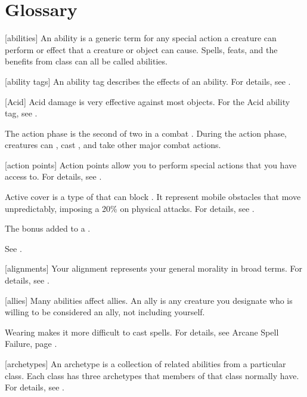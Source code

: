 \chapter{Glossary}\label{Glossary}

[abilities] An ability is a generic term for any special action a creature can perform or effect that a creature or object can cause.
Spells, feats, and the benefits from class  can all be called abilities.

[ability tags] An ability tag describes the effects of an ability.
For details, see .

[Acid] Acid damage is very effective against most objects. For the Acid ability tag, see .

 The action phase is the second of two  in a combat .
During the action phase, creatures can , cast , and take other major combat actions.

[action points] Action points allow you to perform special actions that you have access to.
For details, see .

 Active cover is a type of  that can block .
It represent mobile obstacles that move unpredictably, imposing a 20\%  on physical attacks.
For details, see .

 The bonus added to a .

 See .

[alignments] Your alignment represents your general morality in broad terms.
For details, see .

[allies] Many abilities affect allies.
An ally is any creature you designate who is willing to be considered an ally, not including yourself.

 Wearing  makes it more difficult to cast  spells.
For details, see Arcane Spell Failure, page .

[archetypes] An archetype is a collection of related abilities from a particular class.
Each class has three archetypes that members of that class normally have.
For details, see .

